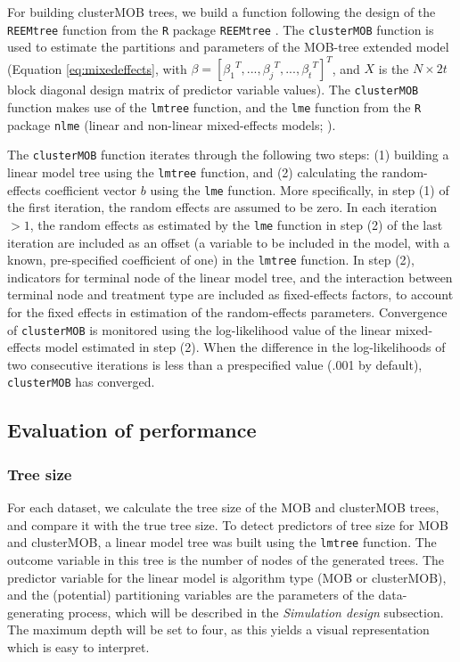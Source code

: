 \documentclass[nobf,man]{apa}
\begin{document}
For building clusterMOB trees, we build a function following the design of the \verb|REEMtree| function from the \verb|R| package \verb|REEMtree| \cite{SelaySimo11}. The \verb|clusterMOB| function is used to estimate the partitions and parameters of the MOB-tree extended model (Equation \ref{eq:mixedeffects}, with $\beta = {\left[{\beta_1}^T,...,{\beta_j}^T,...,{\beta_t}^T \right]}^T$, and $X$ is the $N \times 2t$ block diagonal design matrix of predictor variable values). The \verb|clusterMOB| function makes use of the \verb|lmtree| function, and the \verb|lme| function from the \verb|R| package \verb|nlme| (linear and non-linear mixed-effects models; ). 

The \verb|clusterMOB| function iterates through the following two steps: (1) building a linear model tree using the \verb|lmtree| function, and (2) calculating the random-effects coefficient vector $b$ using the \verb|lme| function. More specifically, in step (1) of the first iteration, the random effects are assumed to be zero. In each iteration $>1$, the random effects as estimated by the \verb|lme| function in step (2) of the last iteration are included as an offset (a variable to be included in the model, with a known, pre-specified coefficient of one) in the \verb|lmtree| function. In step (2), indicators for terminal node of the linear model tree, and the interaction between terminal node and treatment type are included as fixed-effects factors, to account for the fixed effects in estimation of the random-effects parameters. Convergence of \verb|clusterMOB| is monitored using the log-likelihood value of the linear mixed-effects model estimated in step (2). When the difference in the log-likelihoods of two consecutive iterations is less than a prespecified value (.001 by default), \verb|clusterMOB| has converged.  
 



\subsection{Evaluation of performance}

\subsubsection{Tree size} 

For each dataset, we calculate the tree size of the MOB and clusterMOB trees, and compare it with the true tree size. To detect predictors of tree size for MOB and clusterMOB, a linear model tree was built using the \verb|lmtree| function. The outcome variable in this tree is the number of nodes of the generated trees. The predictor variable for the linear model is algorithm type (MOB or clusterMOB), and the (potential) partitioning variables are the parameters of the data-generating process, which will be described in the \textit{Simulation design} subsection. The maximum depth will be set to four, as this yields a visual representation which is easy to interpret.  
\end{document}
